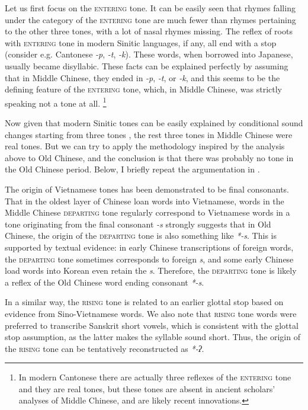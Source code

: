 \documentclass[UTF8, a4paper, oneside, scheme=plain, 12pt]{ctexrep}
\newcommand{\form}[1]{\emph{#1}}
\newcommand*{\category}[1]{\textsc{#1}}
\begin{document}
Let us first focus on the \category{entering} tone.
It can be easily seen that rhymes falling under the category of the \category{entering} tone are much fewer than rhymes pertaining to the other three tones,
with a lot of nasal rhymes missing.
The reflex of roots with \category{entering} tone in modern Sinitic languages, if any,
all end with a stop (consider e.g. Cantonese \form{-p}, \form{-t}, \form{-k}).
These words, when borrowed into Japanese, usually became disyllabic.
These facts can be explained perfectly by assuming that in Middle Chinese,
they ended in \form{-p}, \form{-t}, or \form{-k},
and this seems to be the defining feature of the \category{entering} tone,
which, in Middle Chinese, was strictly speaking not a tone at all.%
\footnote{
    In modern Cantonese there are actually three reflexes of the \category{entering} tone
    and they are real tones,
    but these tones are absent in ancient scholars' analyses of Middle Chinese,
    and are likely recent innovations.
}

Now given that modern Sinitic tones can be easily explained by 
conditional sound changes starting from three tones \citep{sagart1999origin},
the rest three tones in Middle Chinese were real tones.
But we can try to apply the methodology inspired by the analysis above to Old Chinese,
and the conclusion is that there was probably no tone in the Old Chinese period.
Below, I briefly repeat the argumentation in \citet{sagart1999origin}.

The origin of Vietnamese tones has been demonstrated to be final consonants.
That in the oldest layer of Chinese loan words into Vietnamese,
words in the Middle Chinese \category{departing} tone regularly correspond to Vietnamese words in a tone originating from the final consonant \form{-s}
strongly suggests that in Old Chinese,
the origin of the \category{departing} tone is also something like \form{*-s}.
This is supported by textual evidence:
in early Chinese transcriptions of foreign words,
the \category{departing} tone sometimes corresponds to foreign \form{s},
and some early Chinese load words into Korean even retain the \form{s}.
Therefore, the \category{departing} tone is likely a reflex of the Old Chinese word ending consonant \form{*-s}.

In a similar way, the \category{rising} tone is related to an earlier glottal stop
based on evidence from Sino-Vietnamese words.
We also note that \category{rising} tone words were preferred
to transcribe Sanskrit short vowels,
which is consistent with the glottal stop assumption,
as the latter makes the syllable sound short.
Thus, the origin of the \category{rising} tone can be tentatively reconstructed as \form{*-ʔ}.
\end{document}
